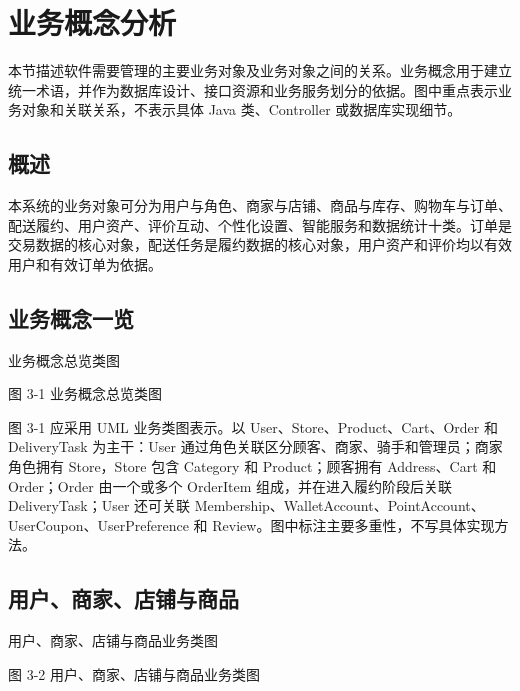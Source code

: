 \section{业务概念分析}

本节描述软件需要管理的主要业务对象及业务对象之间的关系。业务概念用于建立统一术语，并作为数据库设计、接口资源和业务服务划分的依据。图中重点表示业务对象和关联关系，不表示具体 Java 类、Controller 或数据库实现细节。

\subsection{概述}

本系统的业务对象可分为用户与角色、商家与店铺、商品与库存、购物车与订单、配送履约、用户资产、评价互动、个性化设置、智能服务和数据统计十类。订单是交易数据的核心对象，配送任务是履约数据的核心对象，用户资产和评价均以有效用户和有效订单为依据。

\subsection{业务概念一览}

业务概念总览类图

\begin{center}
\end{center}

图 3-1  业务概念总览类图

图 3-1 应采用 UML 业务类图表示。以 User、Store、Product、Cart、Order 和 DeliveryTask 为主干：User 通过角色关联区分顾客、商家、骑手和管理员；商家角色拥有 Store，Store 包含 Category 和 Product；顾客拥有 Address、Cart 和 Order；Order 由一个或多个 OrderItem 组成，并在进入履约阶段后关联 DeliveryTask；User 还可关联 Membership、WalletAccount、PointAccount、UserCoupon、UserPreference 和 Review。图中标注主要多重性，不写具体实现方法。

\subsection{用户、商家、店铺与商品}

用户、商家、店铺与商品业务类图

\begin{center}
\end{center}

图 3-2  用户、商家、店铺与商品业务类图

